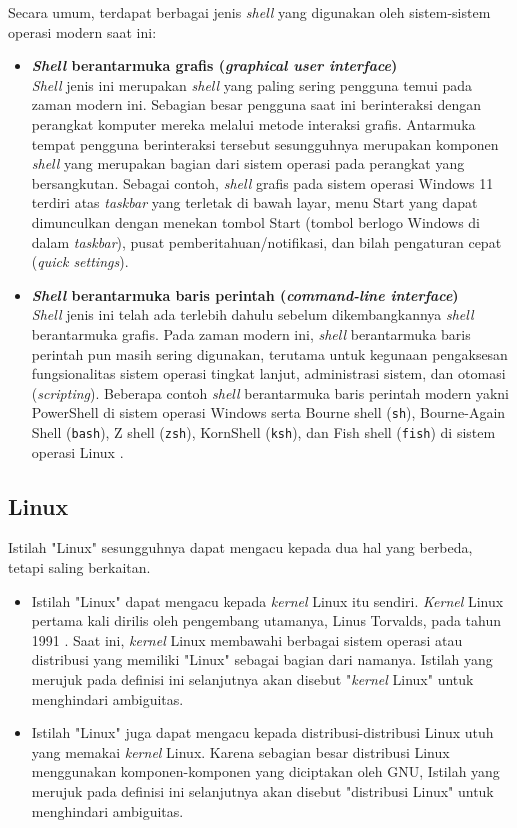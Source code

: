 Secara umum, terdapat berbagai jenis \textit{shell} yang digunakan oleh sistem-sistem operasi modern saat ini:
\begin{itemize}
    \item \textbf{\textit{Shell} berantarmuka grafis (\textit{graphical user interface})}\\
    \textit{Shell} jenis ini merupakan \textit{shell} yang paling sering pengguna temui pada zaman modern ini. Sebagian besar pengguna saat ini berinteraksi dengan perangkat komputer mereka melalui metode interaksi grafis. Antarmuka tempat pengguna berinteraksi tersebut sesungguhnya merupakan komponen \textit{shell} yang merupakan bagian dari sistem operasi pada perangkat yang bersangkutan. Sebagai contoh, \textit{shell} grafis pada sistem operasi Windows 11 terdiri atas \textit{taskbar} yang terletak di bawah layar, menu Start yang dapat dimunculkan dengan menekan tombol Start (tombol berlogo Windows di dalam \textit{taskbar}), pusat pemberitahuan/notifikasi, dan bilah pengaturan cepat (\textit{quick settings}).
    
    \item \textbf{\textit{Shell} berantarmuka baris perintah (\textit{command-line interface})}\\
    \textit{Shell} jenis ini telah ada terlebih dahulu sebelum dikembangkannya \textit{shell} berantarmuka grafis. Pada zaman modern ini, \textit{shell} berantarmuka baris perintah pun masih sering digunakan, terutama untuk kegunaan pengaksesan fungsionalitas sistem operasi tingkat lanjut, administrasi sistem, dan otomasi (\textit{scripting}). Beberapa contoh \textit{shell} berantarmuka baris perintah modern yakni PowerShell di sistem operasi Windows serta Bourne shell (\verb|sh|), Bourne-Again Shell (\verb|bash|), Z shell (\verb|zsh|), KornShell (\verb|ksh|), dan Fish shell (\verb|fish|) di sistem operasi Linux \cite{kidwai2021comparative}.
\end{itemize}

\subsection{Linux}

Istilah "Linux" sesungguhnya dapat mengacu kepada dua hal yang berbeda, tetapi saling berkaitan.
\begin{itemize}
    \item Istilah "Linux" dapat mengacu kepada \textit{kernel} Linux itu sendiri. \textit{Kernel} Linux pertama kali dirilis oleh pengembang utamanya, Linus Torvalds, pada tahun 1991 \cite{tozzi2016linux}. Saat ini, \textit{kernel} Linux membawahi berbagai sistem operasi atau distribusi yang memiliki "Linux" sebagai bagian dari namanya. Istilah yang merujuk pada definisi ini selanjutnya akan disebut "\textit{kernel} Linux" untuk menghindari ambiguitas.
    \item Istilah "Linux" juga dapat mengacu kepada distribusi-distribusi Linux utuh yang memakai \textit{kernel} Linux. Karena sebagian besar distribusi Linux menggunakan komponen-komponen yang diciptakan oleh GNU, Istilah yang merujuk pada definisi ini selanjutnya akan disebut "distribusi Linux" untuk menghindari ambiguitas.
\end{itemize}

